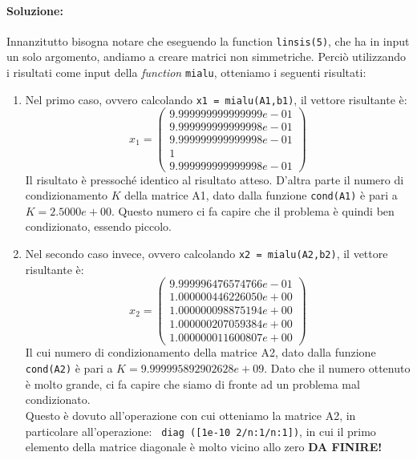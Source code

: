 \documentclass[12pt]{article}
\begin{document}
\paragraph{Soluzione:}
Innanzitutto bisogna notare che eseguendo la function \texttt{linsis(5)}, che ha in input un solo argomento, andiamo a creare matrici non simmetriche. 
Perciò utilizzando i risultati come input della \textit{function} \texttt{mialu}, otteniamo i seguenti risultati:
\begin{enumerate}
    \item Nel primo caso, ovvero calcolando \texttt{x1 = mialu(A1,b1)}, il vettore risultante è: 
    \begin{equation*} x_1=
        \begin{pmatrix}
            9.999999999999999e-01\\
            9.999999999999998e-01\\
            9.999999999999998e-01\\
            1\\
            9.999999999999998e-01
        \end{pmatrix}
    \end{equation*}
    Il risultato è pressoché identico al risultato atteso. D'altra parte il numero di condizionamento \(K\) della matrice A1, dato dalla funzione \texttt{cond(A1)}
    è pari a \(K = 2.5000e+00\). Questo numero ci fa capire che il problema è quindi ben condizionato, essendo piccolo.
    \item Nel secondo caso invece, ovvero calcolando \texttt{x2 = mialu(A2,b2)}, il vettore risultante è:
    \begin{equation*} x_2=
        \begin{pmatrix}
            9.999996476574766e-01\\
            1.000000446226050e+00\\
            1.000000098875194e+00\\
            1.000000207059384e+00\\
            1.000000011600807e+00
        \end{pmatrix}
    \end{equation*}
    Il cui numero di condizionamento della matrice A2, dato dalla funzione \texttt{cond(A2)} è pari a \(K = 9.999995892902628e+09\). Dato che il numero ottenuto è molto 
    grande, ci fa capire che siamo di fronte ad un problema mal condizionato. \\
    Questo è dovuto all'operazione con cui otteniamo la matrice A2, in particolare all'operazione: \texttt{ diag ([1e-10 2/n:1/n:1])}, in cui il primo elemento della matrice 
    diagonale è molto vicino allo zero
    \textbf{DA FINIRE!}
\end{enumerate}
\end{document}
